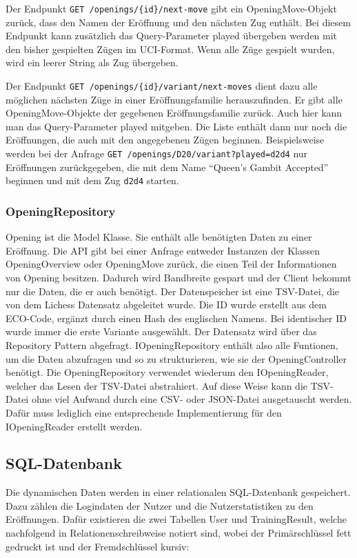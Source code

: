 Der Endpunkt \lstinline|GET /openings/{id}/next-move| gibt ein OpeningMove-Objekt zurück, dass den Namen der Eröffnung und den nächsten Zug enthält. Bei diesem Endpunkt kann zusätzlich das Query-Parameter played übergeben werden mit den bisher gespielten Zügen im \ac{UCI}-Format. Wenn alle Züge gespielt wurden, wird ein leerer String als Zug übergeben.

Der Endpunkt \lstinline|GET /openings/{id}/variant/next-moves| dient dazu alle möglichen nächsten Züge in einer Eröffnungsfamilie herauszufinden. Er gibt alle OpeningMove-Objekte der gegebenen Eröffnungsfamilie zurück. Auch hier kann man das Query-Parameter played mitgeben. Die Liste enthält dann nur noch die Eröffnungen, die auch mit den angegebenen Zügen beginnen. Beispielsweise werden bei der Anfrage \lstinline|GET /openings/D20/variant?played=d2d4| nur Eröffnungen zurückgegeben, die mit dem Name \enquote{Queen's Gambit Accepted} beginnen und mit dem Zug \lstinline|d2d4| starten.


\subsubsection{OpeningRepository}
Opening ist die Model Klasse. Sie enthält alle benötigten Daten zu einer Eröffnung. Die API gibt bei einer Anfrage entweder Instanzen der Klassen OpeningOverview oder OpeningMove zurück, die einen Teil der Informationen von Opening besitzen. Dadurch wird Bandbreite gespart und der Client bekommt nur die Daten, die er auch benötigt. Der Datenspeicher ist eine TSV-Datei, die von dem Lichess Datensatz \cite{lichessorg_chess-openings_2025} abgeleitet wurde. Die ID wurde erstellt aus dem ECO-Code, ergänzt durch einen Hash des englischen Namens. Bei identischer ID wurde immer die erste Variante ausgewählt.
Der Datensatz wird über das Repository Pattern abgefragt. IOpeningRepository enthält also alle Funtionen, um die Daten abzufragen und so zu strukturieren, wie sie der OpeningController benötigt. Die OpeningRepository verwendet wiederum den IOpeningReader, welcher das Lesen der TSV-Datei abstrahiert. Auf diese Weise kann die TSV-Datei ohne viel Aufwand durch eine CSV- oder JSON-Datei ausgetauscht werden. Dafür muss lediglich eine entsprechende Implementierung für den IOpeningReader erstellt werden.

\subsection{SQL-Datenbank}
Die dynamischen Daten werden in einer relationalen SQL-Datenbank gespeichert. Dazu zählen die Logindaten der Nutzer und die Nutzerstatistiken zu den Eröffnungen. Dafür existieren die zwei Tabellen User und TrainingResult, welche nachfolgend in Relationenschreibweise notiert sind, wobei der Primärschlüssel fett gedruckt ist und der Fremdschlüssel kursiv:

